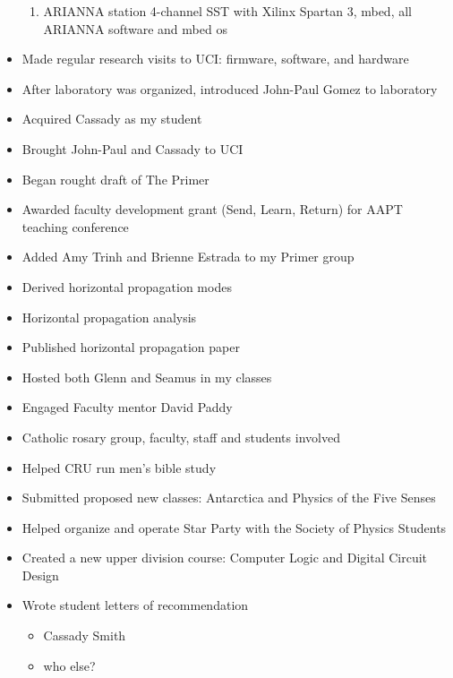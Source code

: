 \begin{itemize}
\begin{enumerate}
\item ARIANNA station 4-channel SST with Xilinx Spartan 3, mbed, all ARIANNA software and mbed os
\end{enumerate}
\item Made regular research visits to UCI: firmware, software, and hardware
\item After laboratory was organized, introduced John-Paul Gomez to laboratory
\item Acquired Cassady as my student
\item Brought John-Paul and Cassady to UCI
\item Began rought draft of The Primer
\item Awarded faculty development grant (Send, Learn, Return) for AAPT teaching conference
\item Added Amy Trinh and Brienne Estrada to my Primer group
\item Derived horizontal propagation modes
\item Horizontal propagation analysis
\item Published horizontal propagation paper
\item Hosted both Glenn and Seamus in my classes
\item Engaged Faculty mentor David Paddy
\item Catholic rosary group, faculty, staff and students involved
\item Helped CRU run men's bible study
\item Submitted proposed new classes: Antarctica and Physics of the Five Senses
\item Helped organize and operate Star Party with the Society of Physics Students
\item Created a new upper division course: Computer Logic and Digital Circuit Design
\item Wrote student letters of recommendation
\begin{itemize}
\item Cassady Smith
\item who else?
\end{itemize}
\end{itemize}
